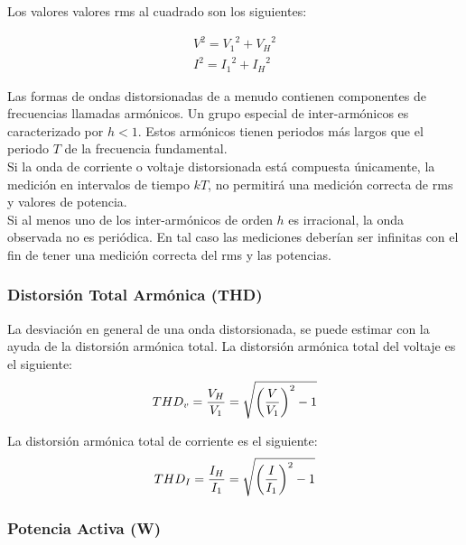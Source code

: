 Los valores valores rms al cuadrado son los siguientes:

\begin{equation}\label{EQ59}
\begin{split}
V^2 = {V_{1}}^2 + {V_{H}}^2 \\
I^2 = {I_{1}}^2 + {I_{H}}^2
\end{split}
\end{equation}

Las formas de ondas distorsionadas de a menudo contienen componentes de frecuencias llamadas armónicos. Un grupo especial de inter-armónicos es caracterizado por $h<1$. Estos armónicos tienen periodos más largos que el periodo $T$ de la frecuencia fundamental.\cite{A30}\\

Si la onda de corriente o voltaje distorsionada está compuesta únicamente, la medición en intervalos de tiempo $kT$, no permitirá una medición correcta de rms y valores de potencia. \cite{A30}\\

Si al menos uno de los inter-armónicos de orden $h$ es irracional, la onda observada no es periódica. En tal caso las mediciones deberían ser infinitas con el fin de tener una medición correcta del rms y las potencias.\cite{A30}\\

\subsubsection{Distorsión Total Armónica (THD) } 

La desviación en general de una onda distorsionada, se puede estimar con la ayuda de la distorsión armónica total. La distorsión armónica total del voltaje es el siguiente:\\

\begin{equation}\label{EQ23}
THD_{v}=\frac{V_{H}}{V_{1}}=\sqrt{\left(\frac{V}{V_{1}}\right)^2-1}\\
\end{equation}

La distorsión armónica total de corriente es el siguiente:\\
\begin{equation}\label{EQ24}
THD_{I}=\frac{I_{H}}{I_{1}}=\sqrt{\left(\frac{I}{I_{1}}\right)^2-1}\\
\end{equation}

\subsubsection{Potencia Activa (W)}

